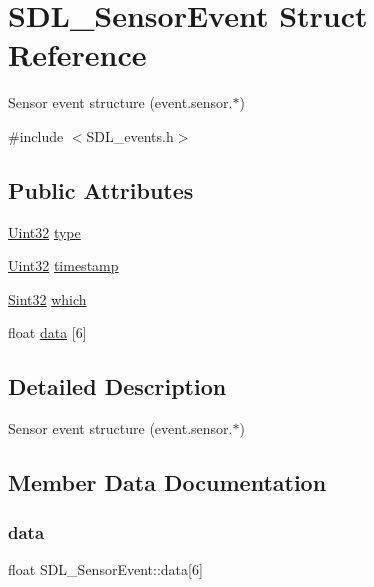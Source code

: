 \hypertarget{struct_s_d_l___sensor_event}{}\section{S\+D\+L\+\_\+\+Sensor\+Event Struct Reference}
\label{struct_s_d_l___sensor_event}


Sensor event structure (event.\+sensor.$\ast$)  




{\ttfamily \#include $<$S\+D\+L\+\_\+events.\+h$>$}

\subsection*{Public Attributes}
\begin{DoxyCompactItemize}
\item 
\mbox{\hyperlink{_s_d_l__stdinc_8h_add440eff171ea5f55cb00c4a9ab8672d}{Uint32}} \mbox{\hyperlink{struct_s_d_l___sensor_event_a0173d64fbe5299cad956298faf3fb0f9}{type}}
\item 
\mbox{\hyperlink{_s_d_l__stdinc_8h_add440eff171ea5f55cb00c4a9ab8672d}{Uint32}} \mbox{\hyperlink{struct_s_d_l___sensor_event_a7de6c2b4d4791f5553b5de225293ceb5}{timestamp}}
\item 
\mbox{\hyperlink{_s_d_l__stdinc_8h_a7a90b941db9d4582e9ad7abb9940ff7e}{Sint32}} \mbox{\hyperlink{struct_s_d_l___sensor_event_aa1c130192bad9b316f811f2d138b3b22}{which}}
\item 
float \mbox{\hyperlink{struct_s_d_l___sensor_event_ab08c166baa755f66b13df0d66ed6d29b}{data}} \mbox{[}6\mbox{]}
\end{DoxyCompactItemize}


\subsection{Detailed Description}
Sensor event structure (event.\+sensor.$\ast$) 

\subsection{Member Data Documentation}
\mbox{\label{struct_s_d_l___sensor_event_ab08c166baa755f66b13df0d66ed6d29b}} 
\subsubsection{\texorpdfstring{data}{data}}
{\footnotesize\ttfamily float S\+D\+L\+\_\+\+Sensor\+Event\+::data\mbox{[}6\mbox{]}}

